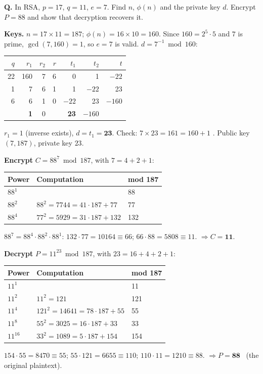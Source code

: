 \begin{worked}
\textbf{Q.} In RSA, $p = 17$, $q = 11$, $e = 7$. Find $n$, $\phi(n)$ and the private key $d$. Encrypt $P = 88$ and show that decryption recovers it.

\textbf{Keys.} $n = 17 \times 11 = 187$; \;$\phi(n) = 16 \times 10 = 160$. Since $160 = 2^5 \cdot 5$ and $7$ is prime, $\gcd(7, 160) = 1$, so $e = 7$ is valid. $d = 7^{-1} \bmod 160$:
\begin{center}\small
\begin{tabular}{@{}r|rrr|rrr@{}}
\toprule
$q$ & $r_1$ & $r_2$ & $r$ & $t_1$ & $t_2$ & $t$\\
\midrule
22 & 160 & 7 & 6 & 0 & 1 & $-22$\\
1 & 7 & 6 & 1 & 1 & $-22$ & 23\\
6 & 6 & 1 & 0 & $-22$ & 23 & $-160$\\
 & \textbf{1} & 0 & & \textbf{23} & $-160$ & \\
\bottomrule
\end{tabular}
\end{center}
$r_1 = 1$ (inverse exists), $d = t_1 = \mathbf{23}$. Check: $7 \times 23 = 161 = 160 + 1$ \checkmark. Public key $(7, 187)$, private key $23$.

\textbf{Encrypt} $C = 88^7 \bmod 187$, with $7 = 4 + 2 + 1$:
\begin{center}\small
\begin{tabular}{@{}lll@{}}
\toprule
Power & Computation & mod 187\\
\midrule
$88^{1}$ & & 88\\
$88^{2}$ & $88^2 = 7744 = 41\cdot187 + 77$ & 77\\
$88^{4}$ & $77^2 = 5929 = 31\cdot187 + 132$ & 132\\
\bottomrule
\end{tabular}
\end{center}
$88^7 = 88^4 \cdot 88^2 \cdot 88^1$: $132 \cdot 77 = 10164 \equiv 66$; \;$66 \cdot 88 = 5808 \equiv 11$. \;$\Rightarrow C = \mathbf{11}$.

\textbf{Decrypt} $P = 11^{23} \bmod 187$, with $23 = 16 + 4 + 2 + 1$:
\begin{center}\small
\begin{tabular}{@{}lll@{}}
\toprule
Power & Computation & mod 187\\
\midrule
$11^{1}$ & & 11\\
$11^{2}$ & $11^2 = 121$ & 121\\
$11^{4}$ & $121^2 = 14641 = 78\cdot187 + 55$ & 55\\
$11^{8}$ & $55^2 = 3025 = 16\cdot187 + 33$ & 33\\
$11^{16}$ & $33^2 = 1089 = 5\cdot187 + 154$ & 154\\
\bottomrule
\end{tabular}
\end{center}
$154 \cdot 55 = 8470 \equiv 55$; \;$55 \cdot 121 = 6655 \equiv 110$; \;$110 \cdot 11 = 1210 \equiv 88$. \;$\Rightarrow P = \mathbf{88}$ \checkmark\ (the original plaintext).
\end{worked}

